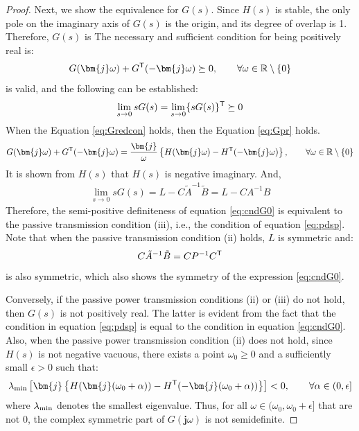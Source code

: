 \documentclass[graybox, envcountchap]{svmult}
\begin{document}
\begin{proof}
Next, we show the equivalence for $G(s)$.
Since $H(s)$ is stable, the only pole on the imaginary axis of $G(s)$ is the origin, and its degree of overlap is 1.
Therefore, $G(s)$ is
The necessary and sufficient condition for being positively real is:
\begin{align}\label{eq:Gpr}
G(\bm{j}\omega) + G^{\sf T}(-\bm{j}\omega) \succeq 0
,\qquad \forall \omega \in \mathbb{R}\setminus\{0\}
\end{align}
is valid, and the following can be established:
\begin{align}\label{eq:cndG0}
\lim_{s\rightarrow 0} s G(s) = \lim_{s\rightarrow 0} \{ s G(s)\}^{\sf T}\succeq 0
\end{align}
When the Equation \ref{eq:Gredcon} holds, then the Equation \ref{eq:Gpr} holds.
\begin{align}\label{eq:NIineq}
G(\bm{j}\omega) + G^{\sf T}(-\bm{j}\omega)
=
\frac{\bm{j}}{\omega} \left\{
H(\bm{j}\omega) - H^{\sf T}(-\bm{j}\omega)
\right\}
,\qquad \forall \omega \in \mathbb{R}\setminus\{0\}
\end{align}
It is shown from $H(s)$ that $H(s)$ is negative imaginary.
And,
\begin{align*}
\lim_{s\rightarrow 0} s G(s) =
L - C\tilde{A}^{-1}\tilde{B} = L - C A^{-1} B
\end{align*}
Therefore, the semi-positive definiteness of equation \ref{eq:cndG0} is equivalent to the passive transmission condition (iii), i.e., the condition of equation \ref{eq:pdsp}.
Note that when the passive transmission condition (ii) holds, $L$ is symmetric and:
\begin{align*}
C\tilde{A}^{-1}\tilde{B} = C P^{-1} C^{\sf T}
\end{align*}
is also symmetric, which also shows the symmetry of the expression \ref{eq:cndG0}.

Conversely, if the passive power transmission conditions (ii) or (iii) do not hold, then $G(s)$ is not positively real.
The latter is evident from the fact that the condition in equation \ref{eq:pdsp} is equal to the condition in equation \ref{eq:cndG0}.
Also, when the passive power transmission condition (ii) does not hold, since $H(s)$ is not negative vacuous, 
there exists a point $\omega_0\geq 0$ and a sufficiently small $\epsilon >0$ such that:
\begin{align*}
\lambda_{\rm min}\left[
\bm{j}
\left\{
H(\bm{j}(\omega_0 + \alpha )) - H^{\sf T}(-\bm{j}(\omega_0 + \alpha ))
\right\}
\right] < 0
,\qquad
\forall \alpha \in (0,\epsilon] 
\end{align*}
where $\lambda_{\rm min}$ denotes the smallest eigenvalue.
Thus, for all $\omega \in (\omega_0, \omega_0+\epsilon] $ that are not 0, the complex symmetric part of $G(\bm{j} \omega) $ is not semidefinite.
\end{proof}
\end{document}
